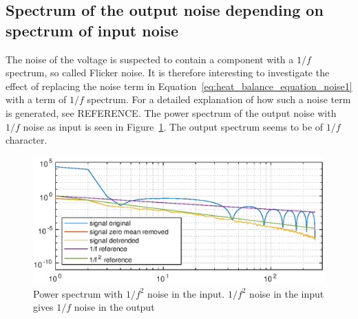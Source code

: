\subsection{Spectrum of the output noise depending on spectrum of input noise}
The noise of the voltage is suspected to contain a component with a $1/f$ spectrum, so called Flicker noise. It is therefore interesting to investigate the effect of replacing the noise term in Equation~\eqref{eq:heat_balance_equation_noise1} with a term of $1/f$ spectrum. For a detailed explanation of how such a noise term is generated, see REFERENCE. The power spectrum
of the output noise with $1/f$ noise as input is seen in Figure~\ref{fig:power_spectrum_pink}. The output spectrum seems to be of $1/f$ character.

\begin{figure}[H]
\includegraphics[scale=0.9]{gfx/spectrum_pink_noise.eps}
\caption{Power spectrum with $1/f^2$ noise in the input. $1/f^2$ noise in the input gives $1/f$ noise in the output}
\label{fig:power_spectrum_pink}
\end{figure}
